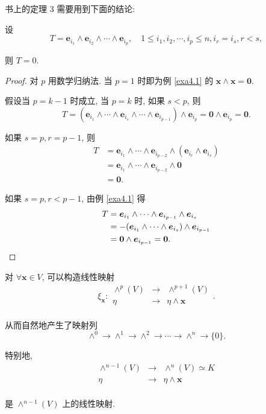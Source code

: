 \documentclass{ctexart}
\begin{document}
书上的定理 3 需要用到下面的结论:
\begin{theorem}\label{t4.2}
    设
    \[T=\boldsymbol{e}_{i_1}\land\boldsymbol{e}_{i_2}\land\cdots\land\boldsymbol{e}_{i_p},\quad1\leq i_1,i_2,\cdots,i_p\leq n,i_r=i_s,r<s,\]

    则 $T=0$.
\end{theorem}
\begin{proof}
    对 $p$ 用数学归纳法. 当 $p=1$ 时即为例 \ref{exa4.1} 的 $\boldsymbol{x}\land\boldsymbol{x}=\boldsymbol{0}$.

    假设当 $p=k-1$ 时成立, 当 $p=k$ 时, 如果 $s<p$, 则
    \[T=(\boldsymbol{e}_{i_1}\land\cdots\land\boldsymbol{e}_{i_s}\land\cdots\land\boldsymbol{e}_{i_{p-1}})\land\boldsymbol{e}_{i_p}=\boldsymbol{0}\land\boldsymbol{e}_{i_p}=\boldsymbol{0}.\]

    如果 $s=p,r=p-1$, 则
    \begin{align*}
        T & =\boldsymbol{e}_{i_1}\land\cdots\land\boldsymbol{e}_{i_{p-2}}\land(\boldsymbol{e}_{i_r}\land\boldsymbol{e}_{i_s}) \\
        & =\boldsymbol{e}_{i_1}\land\cdots\land\boldsymbol{e}_{i_{p-2}}\land\boldsymbol{0} \\
        & =\boldsymbol{0}.
    \end{align*}

    如果 $s=p,r<p-1$, 由例 \ref{exa4.1} 得
    \begin{align*}
        T & =\boldsymbol{e}_{i_1}\land\cdots\land\boldsymbol{e}_{i_{p-1}}\land\boldsymbol{e}_{i_s} \\
        & =-(\boldsymbol{e}_{i_1}\land\cdots\land\boldsymbol{e}_{i_s})\land\boldsymbol{e}_{i_{p-1}} \\
        & =\boldsymbol{0}\land\boldsymbol{e}_{i_{p-1}}=\boldsymbol{0}.\qedhere
    \end{align*}
\end{proof}
\begin{example}
    对 $\forall\boldsymbol{x}\in V$, 可以构造线性映射
    \[\xi_{\boldsymbol{x}}:\begin{array}{rcl}
        \wedge^p(V) & \rightarrow & \wedge^{p+1}(V) \\
        \eta & \rightarrow & \eta\wedge\boldsymbol{x} \\
    \end{array}.\]

    从而自然地产生了映射列
    \[\wedge^0\to\wedge^1\to\wedge^2\to\cdots\to\wedge^n\to\{0\}.\]

    特别地,
    \[\begin{array}{rcl}
        \wedge^{n-1}(V) & \rightarrow & \wedge^n(V)\simeq K \\
        \eta & \rightarrow & \eta\wedge\boldsymbol{x} \\
    \end{array}\]

    是 $\wedge^{n-1}(V)$ 上的线性映射.
\end{example}
\end{document}
